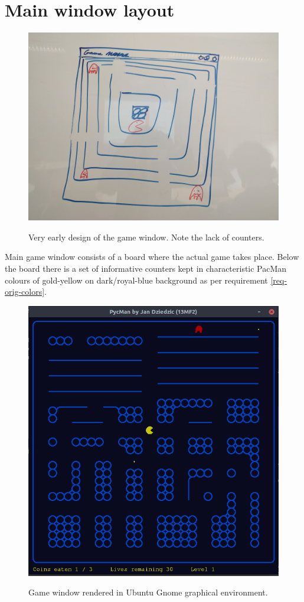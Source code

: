 \documentclass[11pt,a4paper,notitlepage]{report}
\newenvironment{img}{
	\begin{center}
		\begin{figure}[H]
			\begin{center}
			
}{
	\end{center}
		\end{figure}
			\end{center}
}
\begin{document}
		\section{Main window layout}
			\begin{img}
				\includegraphics[width=350pt]{images/window_whiteboard.jpg}\\
				\caption{Very early design of the game window. Note the lack of counters.}
			\end{img}
			Main game window consists of a board where the actual game takes place.
			Below the board there is a set of informative counters kept in characteristic PacMan colours of gold-yellow on dark/royal-blue background as per requirement \ref{req-orig-colors}.
			\begin{img}
				\includegraphics[width=350pt]{images/window-in-ubuntu}\\
				\caption{Game window rendered in Ubuntu Gnome graphical environment.}
			\end{img}
			
\end{document}
